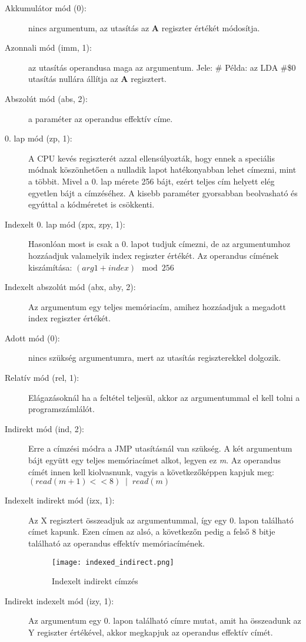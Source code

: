 \begin{description}
	\item[Akkumulátor mód (0):] nincs argumentum, az utasítás az \textbf{A} regiszter értékét módosítja.
	\item[Azonnali mód (imm, 1):] az utasítás operandusa maga az argumentum. Jele: \#
	\newline
	Példa: az LDA \#\$0 utasítás nullára állítja az \textbf{A} regisztert.
	\item[Abszolút mód (abs, 2):] a paraméter az operandus effektív címe.
	\item[0. lap mód (zp, 1):] A CPU kevés regiszterét azzal ellensúlyozták, hogy ennek a speciális módnak köszönhetően a nulladik lapot hatékonyabban lehet címezni, mint a többit. 
	Mivel a 0. lap mérete 256 bájt, ezért teljes cím helyett elég egyetlen bájt a címzéséhez.
	A kisebb paraméter gyorsabban beolvasható és egyúttal a kódméretet is csökkenti.
	\item[Indexelt 0. lap mód (zpx, zpy, 1):]
	Hasonlóan most is csak a 0. lapot tudjuk címezni, de az argumentumhoz hozzáadjuk valamelyik index regiszter értékét.
	Az operandus címének kiszámítása: $ (arg1 + index) \mod 256 $
	\item[Indexelt abszolút mód (abx, aby, 2):] Az argumentum egy teljes memóriacím, amihez hozzáadjuk a megadott index regiszter értékét. 
	\item[Adott mód (0):] nincs szükség argumentumra, mert az utasítás regiszterekkel dolgozik.
	\item[Relatív mód (rel, 1):] Elágazásoknál ha a feltétel teljesül, akkor az argumentummal el kell tolni a programszámlálót.
	\item[Indirekt mód (ind, 2):] 
	Erre a címzési módra a JMP utasításnál van szükség.
	A két argumentum bájt együtt egy teljes memóriacímet alkot, legyen ez \emph{m}.
	Az operandus címét innen kell kiolvasnunk, vagyis a következőképpen kapjuk meg: $ (read(m+1) << 8) \;\; | \;\; read(m) $ 
	\item[Indexelt indirekt mód (izx, 1):]
	Az X regisztert összeadjuk az argumentummal, így egy 0. lapon található címet kapunk.
	Ezen címen az alsó, a következőn pedig a felső 8 bitje található az operandus effektív memóriacímének.
	\begin{figure}[H]
		\centering
		\texttt{[image: indexed\_indirect.png]}
		\caption{Indexelt indirekt címzés}
	\end{figure}
	\item[Indirekt indexelt mód (izy, 1):]
	Az argumentum egy 0. lapon található címre mutat, amit ha összeadunk az Y regiszter értékével, akkor megkapjuk az operandus effektív címét. 
	
	
	
\end{description}

